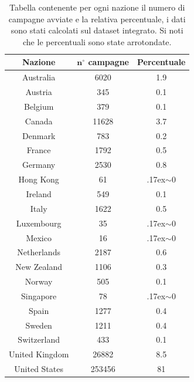 \begin{table}
	\caption{Tabella contenente per ogni nazione il numero di campagne avviate e la relativa percentuale, i dati sono stati calcolati sul dataset integrato. Si noti che le percentuali sono state arrotondate.}
	
	\label{tab:prj_country}
	
	\centering
	\begin{tabular}{|c|c|c|}
		\hline
		\textbf{Nazione} & \textbf{$\mathbf{n^{\circ}}$ campagne} & \textbf{Percentuale}\\
		\hline
		Australia & 6020 & 1.9 \\
		\hline
		Austria & 345 & 0.1 \\
		\hline
		Belgium & 379 & 0.1\\
		\hline
		Canada & 11628 & 3.7\\
		\hline
		Denmark & 783 & 0.2\\
		\hline
		France & 1792 & 0.5\\
		\hline
		Germany & 2530 & 0.8\\
		\hline
		Hong Kong & 61 & {\raise.17ex\hbox{$\scriptstyle\sim$}}0\\
		\hline
		Ireland & 549 & 0.1\\
		\hline
		Italy & 1622 & 0.5\\
		\hline
		Luxembourg & 35 & {\raise.17ex\hbox{$\scriptstyle\sim$}}0\\
		\hline
		Mexico & 16 & {\raise.17ex\hbox{$\scriptstyle\sim$}}0\\
		\hline
		Netherlands & 2187 & 0.6\\
		\hline
		New Zealand & 1106 & 0.3\\
		\hline
		Norway & 505 & 0.1\\
		\hline
		Singapore & 78 & {\raise.17ex\hbox{$\scriptstyle\sim$}}0\\
		\hline
		Spain & 1277 & 0.4\\
		\hline
		Sweden & 1211 & 0.4\\
		\hline
		Switzerland & 433 & 0.1\\
		\hline
		United Kingdom & 26882 & 8.5\\
		\hline
		United States & 253456 & 81\\
		\hline
	\end{tabular}
\end{table}

